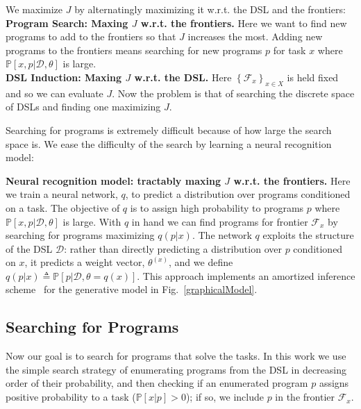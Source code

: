 \documentclass{article}
\newcommand{\system}{EC2.0~}
\newcommand{\probability}{\mathds{P}} %
\begin{document}
We maximize $J$ by alternatingly maximizing it w.r.t. the DSL and the frontiers:
\\\noindent \textbf{Program Search: Maxing $J$ w.r.t. the frontiers.} Here we
want to find new programs to add to  the frontiers so that $J$ increases the most.
Adding new programs to the frontiers means searching for new programs $p$ for task $x$
where $\probability[x,p|\mathcal{D},\theta]$ is large.
\\\noindent \textbf{DSL Induction: Maxing $J$ w.r.t. the DSL.} Here $\left\{\mathcal{F}_x \right\}_{x\in X}$ is held fixed and so we can evaluate $J$. Now the problem is that of searching the discrete space of DSLs and finding one maximizing $J$.

Searching for programs is extremely difficult because
of how large the search space is. We ease the difficulty of the search by learning a neural recognition model:

\textbf{Neural recognition model: tractably maxing $J$ w.r.t. the
  frontiers.}  Here we train a neural network, $q$, to predict a
distribution over programs conditioned on a task. The objective of $q$
is to assign high probability to programs $p$ where
$\probability[x,p|\mathcal{D},\theta]$ is large.  With $q$ in hand we can find programs for
frontier $\mathcal{F}_x$ by searching for programs maximizing
$q(p|x)$.
The network $q$ exploits the structure of the DSL $\mathcal{D}$:
rather than directly predicting a distribution over $p$ conditioned on $x$,
it predicts a weight vector, $\theta^{(x)}$, and we define $q(p|x)\triangleq \probability[p|\mathcal{D},\theta = q(x)]$.
This approach implements an amortized
inference scheme~\cite{ritchie2016deep} for the generative model in
Fig.~\ref{graphicalModel}.




\subsection{Searching for Programs}\label{explorationSection}

Now our goal is to search for programs that solve the tasks.  In this
work we use the simple search strategy of enumerating programs from
the DSL  in decreasing order of their probability,
and then checking if an enumerated program $p$ assigns positive
probability to a task ($\probability[x|p] > 0$); if so, we include $p$ in
the frontier $\mathcal{F}_x$.
\end{document}
